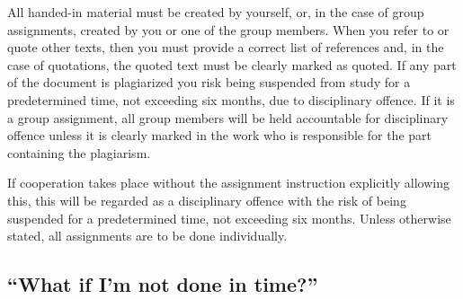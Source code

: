 All handed-in material must be created by yourself, or, in the case of group 
assignments, created by you or one of the group members.
When you refer to or quote other texts, then you must provide a correct list of 
references and, in the case of quotations, the quoted text must be clearly 
marked as quoted.
If any part of the document is plagiarized you risk being suspended from study  
for a predetermined time, not exceeding six months, due to disciplinary 
offence.
If it is a group assignment, all group members will be held accountable for 
disciplinary offence unless it is clearly marked in the work who is responsible 
for the part containing the plagiarism.

If cooperation takes place without the assignment instruction explicitly 
allowing this, this will be regarded as a disciplinary offence with the risk of 
being suspended for a predetermined time, not exceeding six months.
Unless otherwise stated, all assignments are to be done individually.

\subsection{\enquote{What if I'm not done in time?}}
\label{WhatIfImLate}



\printbibliography{}

